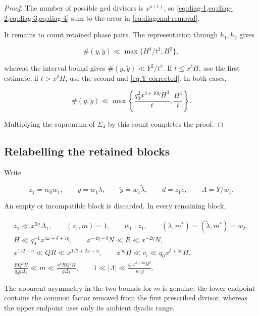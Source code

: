 \begin{proof}
The number of possible gcd divisors is $x^{o(1)}$, so
\cref{eq:diag-1,eq:diag-2,eq:diag-3,eq:diag-4} sum to the error in
\cref{eq:diagonal-removal}.

It remains to count retained phase pairs.  The representation through
$h_1,h_2$ gives

\[
 \#(y,\widetilde y)\ll\max\{H^4/t^2,H^2\},
\]

whereas the interval bound gives
$\#(y,\widetilde y)\ll Y^2/t^2$.  If $t\le x^\delta H$, use the first
estimate; if $t>x^\delta H$, use the second and
\cref{eq:Y-corrected}.  In both cases,

\begin{equation}\label{eq:retained-pairs}
 \#(y,\widetilde y)
 \ll\max\left\{
 \frac{q_0^2x^{\delta+10\eta}H^3}{t},
 \frac{H^4}{t}
 \right\}.
\end{equation}

Multiplying the supremum of $\Sigma_4$ by this count completes the proof.
\end{proof}

\subsection{Relabelling the retained blocks}

Write

\begin{equation}\label{eq:relabel}
 z_1=w_0w_1,\qquad y=w_1\lambda,\qquad
 \widetilde y=w_1\widetilde\lambda,\qquad d=z_1e,
 \qquad \Lambda=Y/w_1.
\end{equation}

An empty or incompatible block is discarded.  In every remaining block,

\begin{gather}
 z_1\ll x^{5\eta}\Delta_1,\qquad (z_1,m)=1,\qquad
 w_1\mid z_1,\qquad
 (\lambda,m^*)=(\widetilde\lambda,m^*)=w_2,
 \label{eq:Z5-arithmetic}\\
 H\ll q_0^{-1}x^{4\omega+\delta+7\eta},\qquad
 x^{-4\eta-\delta}N\ll R\ll x^{-2\eta}N,
 \label{eq:Z5-ranges-a}\\
 x^{1/2-\eta}\ll QR\ll x^{1/2+2\omega+\eta},\qquad
 x^{5\eta}H\ll v_i\ll q_0x^{\delta+5\eta}H,
 \label{eq:Z5-ranges-b}\\
 \frac{RQ^2H}{q_0g\Delta_1}\ll m
 \ll\frac{x^\delta RQ^2H}{g\Delta_1},\qquad
 1\ll|\Lambda|\ll
 \frac{q_0x^{\delta+5\eta}H^2}{w_1g}.
 \label{eq:Z5-ranges-c}
\end{gather}

The apparent asymmetry in the two bounds for $m$ is genuine: the lower
endpoint contains the common factor removed from the first prescribed
divisor, whereas the upper endpoint uses only its ambient dyadic range.

